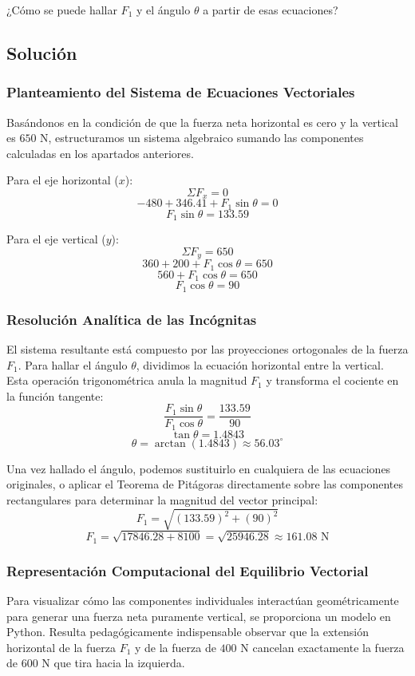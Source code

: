 \documentclass[12pt, a4paper]{article}
\begin{document}
¿Cómo se puede hallar $F_1$ y el ángulo $\theta$ a partir de esas ecuaciones?

\subsection*{Solución}

\subsubsection*{Planteamiento del Sistema de Ecuaciones Vectoriales}
Basándonos en la condición de que la fuerza neta horizontal es cero y la vertical es $650 \text{ N}$, estructuramos un sistema algebraico sumando las componentes calculadas en los apartados anteriores.

Para el eje horizontal ($x$):
$$\Sigma F_x = 0$$
$$-480 + 346.41 + F_1 \sin\theta = 0$$
$$F_1 \sin\theta = 133.59$$

Para el eje vertical ($y$):
$$\Sigma F_y = 650$$
$$360 + 200 + F_1 \cos\theta = 650$$
$$560 + F_1 \cos\theta = 650$$
$$F_1 \cos\theta = 90$$

\subsubsection*{Resolución Analítica de las Incógnitas}
El sistema resultante está compuesto por las proyecciones ortogonales de la fuerza $F_1$. Para hallar el ángulo $\theta$, dividimos la ecuación horizontal entre la vertical. Esta operación trigonométrica anula la magnitud $F_1$ y transforma el cociente en la función tangente:
$$\frac{F_1 \sin\theta}{F_1 \cos\theta} = \frac{133.59}{90}$$
$$\tan\theta = 1.4843$$
$$\theta = \arctan(1.4843) \approx 56.03^\circ$$

Una vez hallado el ángulo, podemos sustituirlo en cualquiera de las ecuaciones originales, o aplicar el Teorema de Pitágoras directamente sobre las componentes rectangulares para determinar la magnitud del vector principal:
$$F_1 = \sqrt{(133.59)^2 + (90)^2}$$
$$F_1 = \sqrt{17846.28 + 8100} = \sqrt{25946.28} \approx 161.08 \text{ N}$$

\subsubsection*{Representación Computacional del Equilibrio Vectorial}
Para visualizar cómo las componentes individuales interactúan geométricamente para generar una fuerza neta puramente vertical, se proporciona un modelo en Python. Resulta pedagógicamente indispensable observar que la extensión horizontal de la fuerza $F_1$ y de la fuerza de $400 \text{ N}$ cancelan exactamente la fuerza de $600 \text{ N}$ que tira hacia la izquierda.
\end{document}
